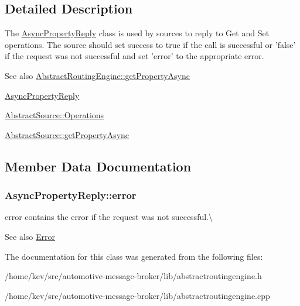 \subsection{Detailed Description}
The \hyperlink{classAsyncPropertyReply}{Async\+Property\+Reply} class is used by sources to reply to Get and Set operations. The source should set success to true if the call is successful or 'false' if the request was not successful and set 'error' to the appropriate error. 

\begin{DoxySeeAlso}{See also}
\hyperlink{classAbstractRoutingEngine_ad1cbda415f674be4a3ce49be05aa8ee8}{Abstract\+Routing\+Engine\+::get\+Property\+Async} 

\hyperlink{classAsyncPropertyReply}{Async\+Property\+Reply} 

\hyperlink{classAbstractSource_aad1e5e4914f2aa174dfd8fa6e143c1b9}{Abstract\+Source\+::\+Operations} 

\hyperlink{classAbstractSource_a05589e699ea16a14675db226d51bdf9f}{Abstract\+Source\+::get\+Property\+Async} 
\end{DoxySeeAlso}


\subsection{Member Data Documentation}
\hypertarget{classAsyncPropertyReply_a8c5cb98a6e2a72d6d94b43449a5e842d}{
\subsubsection[{error}]{ Async\+Property\+Reply\+::error}}\label{classAsyncPropertyReply_a8c5cb98a6e2a72d6d94b43449a5e842d}


error contains the error if the request was not successful.\textbackslash{} 

\begin{DoxySeeAlso}{See also}
\hyperlink{classAsyncPropertyReply_ad91affaa25fcc3b73947a6cf4591e5d1}{Error} 
\end{DoxySeeAlso}


The documentation for this class was generated from the following files\+:\begin{DoxyCompactItemize}
\item 
/home/kev/src/automotive-\/message-\/broker/lib/abstractroutingengine.\+h\item 
/home/kev/src/automotive-\/message-\/broker/lib/abstractroutingengine.\+cpp\end{DoxyCompactItemize}
